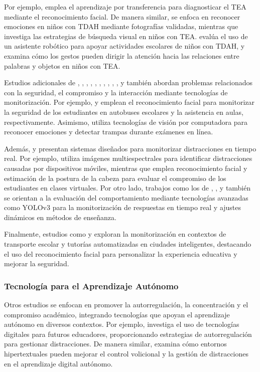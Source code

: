 \documentclass[a4paper,fleqn]{cas-sc}
\begin{document}
					Por ejemplo, \cite{Akter2021} emplea el aprendizaje por transferencia para diagnosticar el TEA mediante el reconocimiento facial. De manera similar, \cite{Pelc2006} se enfoca en reconocer emociones en niños con TDAH mediante fotografías validadas, mientras que \cite{Albrecht2014} investiga las estrategias de búsqueda visual en niños con TEA. \cite{Berrezueta-Guzman2021} evalúa el uso de un asistente robótico para apoyar actividades escolares de niños con TDAH, y \cite{VilliersRader2021} examina cómo los gestos pueden dirigir la atención hacia las relaciones entre palabras y objetos en niños con TEA.
					
					Estudios adicionales de \cite{Boumiza2017}, \cite{DaCosta2023}, \cite{Enadula2021}, \cite{Farsani2020}, \cite{Hachad2020}, \cite{James2019},  \cite{Kulkarni2023}, \cite{Kumar2024Zoom}, \cite{Muller2018ArchnSmile}, \cite{Narkhede2023}, y \cite{Ozdamli2022} también abordan problemas relacionados con la seguridad, el compromiso y la interacción mediante tecnologías de monitorización. Por ejemplo, \cite{Hachad2020} y \cite{James2019} emplean el reconocimiento facial para monitorizar la seguridad de los estudiantes en autobuses escolares y la asistencia en aulas, respectivamente. Asimismo, \cite{Ozdamli2022} utiliza tecnologías de visión por computadora para reconocer emociones y detectar trampas durante exámenes en línea.
					
					Además, \cite{Campbell2015Using} y \cite{Ucar2022Recognizing} presentan sistemas diseñados para monitorizar distracciones en tiempo real. Por ejemplo, \cite{Campbell2015Using} utiliza imágenes multiespectrales para identificar distracciones causadas por dispositivos móviles, mientras que \cite{Ucar2022Recognizing} emplea reconocimiento facial y estimación de la postura de la cabeza para evaluar el compromiso de los estudiantes en clases virtuales. Por otro lado, trabajos como los de \cite{Argel2023Intellitell}, \cite{Erazo2016Easing}, y \cite{Nguyen2019} también se orientan a la evaluación del comportamiento mediante tecnologías avanzadas como YOLOv3 para la monitorización de respuestas en tiempo real y ajustes dinámicos en métodos de enseñanza.
					
					Finalmente, estudios como \cite{Boumiza2017} y \cite{DaCosta2023} exploran la monitorización en contextos de transporte escolar y tutorías automatizadas en ciudades inteligentes, destacando el uso del reconocimiento facial para personalizar la experiencia educativa y mejorar la seguridad.
				
				\subsubsection{Tecnología para el Aprendizaje Autónomo}
					Otros estudios se enfocan en promover la autorregulación, la concentración y el compromiso académico, integrando tecnologías que apoyan el aprendizaje autónomo en diversos contextos. Por ejemplo, \cite{Bembich2016Future} investiga el uso de tecnologías digitales para futuros educadores, proporcionando estrategias de autorregulación para gestionar distracciones. De manera similar, \cite{Peters2003Self} examina cómo entornos hipertextuales pueden mejorar el control volicional y la gestión de distracciones en el aprendizaje digital autónomo.
					
\end{document}
